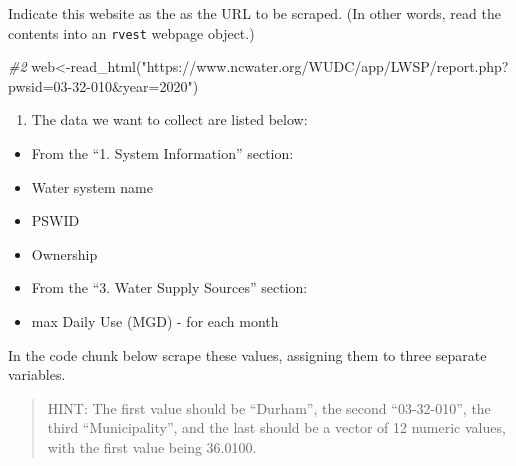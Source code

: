 \documentclass[
]{article}
\newenvironment{Shaded}{\begin{snugshade}}{\end{snugshade}}
\newcommand{\CommentTok}[1]{\textcolor[rgb]{0.56,0.35,0.01}{\textit{#1}}}
\newcommand{\FunctionTok}[1]{\textcolor[rgb]{0.00,0.00,0.00}{#1}}
\newcommand{\NormalTok}[1]{#1}
\newcommand{\OtherTok}[1]{\textcolor[rgb]{0.56,0.35,0.01}{#1}}
\newcommand{\StringTok}[1]{\textcolor[rgb]{0.31,0.60,0.02}{#1}}
\providecommand{\tightlist}{%
  \setlength{\itemsep}{0pt}\setlength{\parskip}{0pt}}
\begin{document}
Indicate this website as the as the URL to be scraped. (In other words,
read the contents into an \texttt{rvest} webpage object.)

\begin{Shaded}
\begin{Highlighting}[]
\CommentTok{\#2}
\NormalTok{web}\OtherTok{\textless{}{-}}\FunctionTok{read\_html}\NormalTok{(}\StringTok{"https://www.ncwater.org/WUDC/app/LWSP/report.php?pwsid=03{-}32{-}010\&year=2020"}\NormalTok{)}
\end{Highlighting}
\end{Shaded}

\begin{enumerate}
\def\labelenumi{\arabic{enumi}.}
\setcounter{enumi}{2}
\tightlist
\item
  The data we want to collect are listed below:
\end{enumerate}

\begin{itemize}
\item
  From the ``1. System Information'' section:
\item
  Water system name
\item
  PSWID
\item
  Ownership
\item
  From the ``3. Water Supply Sources'' section:
\item
  max Daily Use (MGD) - for each month
\end{itemize}

In the code chunk below scrape these values, assigning them to three
separate variables.

\begin{quote}
HINT: The first value should be ``Durham'', the second ``03-32-010'',
the third ``Municipality'', and the last should be a vector of 12
numeric values, with the first value being 36.0100.
\end{quote}
\end{document}
